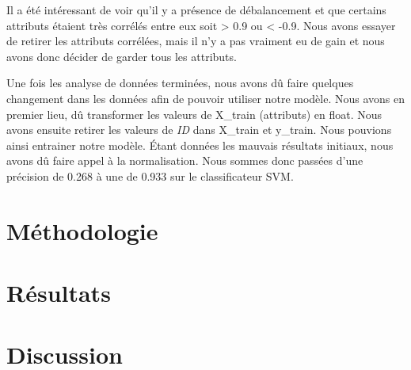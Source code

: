 \documentclass[12pt]{extarticle}
\begin{document}
\vspace{5mm}

Il a été intéressant de voir qu'il y a présence de débalancement et que certains attributs étaient très corrélés entre eux soit > 0.9 ou < -0.9. Nous avons essayer de retirer les attributs corrélées, mais il n'y a pas vraiment eu de gain et nous avons donc décider de garder tous les attributs.

Une fois les analyse de données terminées, nous avons dû faire quelques changement dans les données afin de pouvoir utiliser notre modèle. Nous avons en premier lieu, dû transformer les valeurs de X\_train (attributs) en float. Nous avons ensuite retirer les valeurs de \emph{ID} dans X\_train et y\_train. Nous pouvions ainsi entrainer notre modèle. Étant données les mauvais résultats initiaux, nous avons dû faire appel à la normalisation. Nous sommes donc passées d'une précision de 0.268 à une de 0.933 sur le classificateur SVM.

\section{Méthodologie}
\label{sec:org94ef7a2}
\section{Résultats}
\label{sec:org6d04546}
\section{Discussion}
\label{sec:org93a931b}
\end{document}
